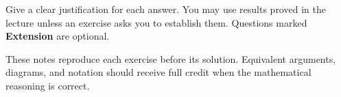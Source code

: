
\begin{callout}[note][Instructions]
    Give a clear justification for each answer. You may use results proved in
    the lecture unless an exercise asks you to establish them. Questions marked
    \textbf{Extension} are optional.
\end{callout}

\begin{solutionsonly}
\begin{callout}[note][Instructions]
    These notes reproduce each exercise before its solution. Equivalent
    arguments, diagrams, and notation should receive full credit when the
    mathematical reasoning is correct.
\end{callout}
\end{solutionsonly}

